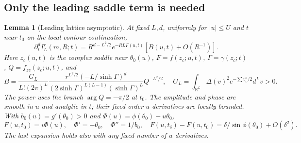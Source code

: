 \documentclass[11pt,a4paper]{article}
\numberwithin{equation}{section}
\theoremstyle{plain}
\newtheorem{lemma}[theorem]{Lemma}
\theoremstyle{definition}
\begin{document}
\subsection{Only the leading saddle term is needed}\label{sec:asymptotic}
\begin{lemma}[Leading lattice asymptotic]\label{lem:saddle}
At fixed $L,d$, uniformly for $|u|\le U$ and $t$ near $t_0$ on the local contour continuation,
\begin{equation}
\partial_t^d I_L^r(m,R;t)=R^{d-L^2/2}e^{-RL F(u,t)}[B(u,t)+O(R^{-1})].\label{eq:16}
\end{equation}
Here $z_c(u,t)$ is the complex saddle near $\theta_0(u)$, $F=f(z_c;u,t)$, $\Gamma=\gamma(z_c;t)$, $Q=f_{zz}(z_c;u,t)$, and
\begin{equation}
 B=\frac{G_L}{L!(2\pi)^L}\frac{r^{L^2/2}(-L/\sinh\Gamma)^d}{(2\sinh\Gamma)^{L(L-1)}(\sinh\Gamma)^L}Q^{-L^2/2},\quad
G_L=\int_{\mathbb R^L}\Delta(v)^2e^{-\sum v_i^2/2}d^Lv>0.\label{eq:A17}
\end{equation}
The power uses the branch $\arg Q=-\pi/2$ at $t_0$. The amplitude and phase are smooth in $u$ and analytic in $t$; their fixed-order $u$ derivatives are locally bounded. With $b_0(u)=g'(\theta_0)>0$ and $\Phi(u)=\phi(\theta_0)-u\theta_0$,
\begin{equation}
F(u,t_0)=i\Phi(u),\quad \Phi'=-\theta_0,\quad \Phi''=1/b_0,
\quad F(u,t_\delta)-F(u,t_0)=\delta/\sin\phi(\theta_0)+O(\delta^2).\label{eq:17}
\end{equation}
The last expansion holds also with any fixed number of $u$ derivatives.
\end{lemma}
\end{document}
